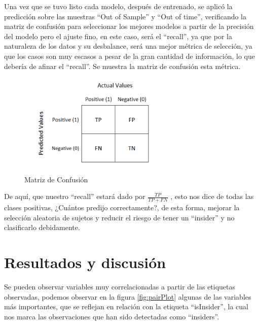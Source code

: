 \documentclass[runningheads]{llncs}
\begin{document}
Una vez que se tuvo listo cada modelo, después de entrenado, se aplicó la predicción sobre las muestras ``Out of Sample'' y ``Out of time'', verificando la matriz de confusión para seleccionar los mejores modelos a partir de la precisión del modelo pero el ajuste fino, en este caso, será el ``recall'', ya que por la naturaleza de los datos y su desbalance, será una mejor métrica de selección, ya que los casos son muy escasos a pesar de la gran cantidad de información, lo que debería de afinar el ``recall''. Se muestra la matriz de confusión esta métrica.

\begin{figure}[h]
    \centering
    \includegraphics[width=0.6\textwidth]{imagenes/confusionMatrix.PNG}
    \caption{Matriz de Confusión}
    \label{fig:confusionMatrix}
\end{figure}

De aquí, que nuestro ``recall'' estará dado por $\frac{TP}{TP+FN}$ , esto nos dice de todas las clases positivas, ¿Cuántos predijo correctamente?, de esta forma, mejorar la selección aleatoria de sujetos y reducir el riesgo de tener un ``insider'' y no clasificarlo debidamente.

\section{Resultados y discusión}
\label{sec:resultados}

Se pueden observar variables muy correlacionadas a partir de las etiquetas observadas, podemos observar en la figura \ref{fig:pairPlot} algunas de las variables más importantes, que se reflejan en relación con la etiqueta ``isInsider'', la cual nos marca las observaciones que han sido detectadas como ``insiders''.
\end{document}
